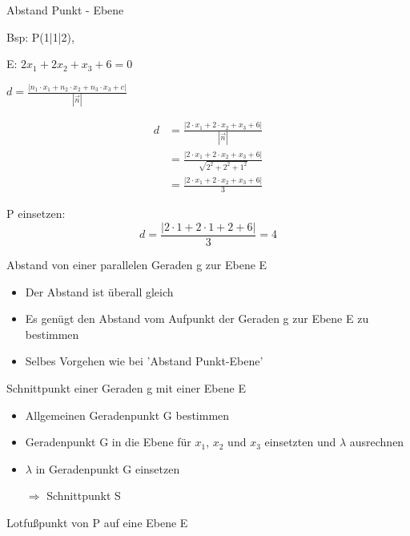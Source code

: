 \begin{frage}Abstand Punkt - Ebene
	
	Bsp: P(1|1|2),
	
	E: $2x_1 + 2x_2+ x_3 + 6=0$\end{frage}
\begin{antwort}\LARGE
	$d=\frac{|n_1 \cdot x_1 + n_2 \cdot x_2+ n_3 \cdot x_3 + c|}{|\vec{n}|}$
	
	\bigskip
	\large
	\begin{align*}
	d&=\frac{|2 \cdot x_1 + 2 \cdot x_2+ x_3 + 6|}{|\vec{n}|} \\
	&=\frac{|2 \cdot x_1 + 2 \cdot x_2+ x_3 + 6|}{\sqrt{2^2+2^2+1^2}} \\
	&=\frac{|2 \cdot x_1 + 2 \cdot x_2+ x_3 + 6|}{3}
	\end{align*}
	
	P einsetzen:
	\[ d=\frac{|2 \cdot 1 + 2 \cdot 1+ 2 + 6|}{3}=4 \]\end{antwort}
\begin{frage}Abstand von einer parallelen Geraden g zur Ebene E\end{frage}
\begin{antwort}\begin{itemize} 
		\item Der Abstand ist überall gleich
		\item Es genügt den Abstand vom Aufpunkt der Geraden g zur Ebene E zu bestimmen
		\item Selbes Vorgehen wie bei 'Abstand Punkt-Ebene'	
	\end{itemize}\end{antwort}
\begin{frage}Schnittpunkt einer Geraden g mit einer Ebene E\end{frage}
\begin{antwort}\begin{itemize} 
		\item Allgemeinen Geradenpunkt G bestimmen
		\item Geradenpunkt G in die Ebene für $x_1$, $x_2$ und $x_3$ einsetzten und $\lambda$ ausrechnen
		\item $\lambda$ in Geradenpunkt G einsetzen
		
		 $\Rightarrow$ Schnittpunkt S
	\end{itemize}\end{antwort}
\begin{frage}Lotfußpunkt von P auf eine Ebene E\end{frage}
